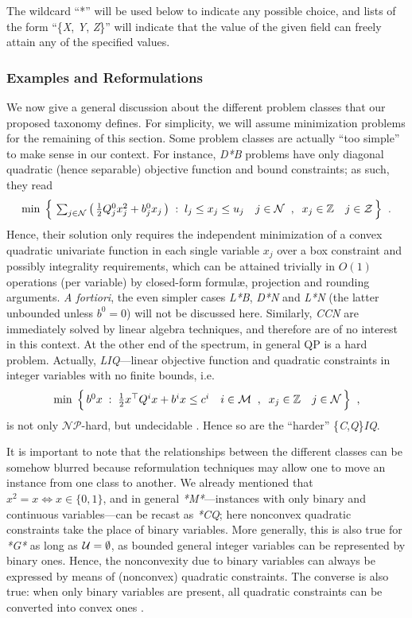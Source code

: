 The wildcard ``*'' will be used below to indicate any possible choice, and lists of the form ``\{\textit{X}, \textit{Y}, \textit{Z}\}'' will indicate that the value of the given field can freely attain any of the specified values.



\subsubsection{Examples and Reformulations}\label{ssec:reform}

We now give a general discussion about the different problem classes that our proposed taxonomy defines.
For simplicity, we will assume minimization problems for the remaining of this section.
Some problem classes are actually ``too simple'' to make sense in our context. For instance, \textit{D*B} problems have only diagonal quadratic (hence separable) objective function and bound constraints; as such, they read
\[
 \textstyle
 \min \; \Big\{ \,
 \sum_{j \in \mathcal{N}} \big( \, {\textstyle \frac{1}{2}} Q^0_j x_j^2 + b^0_j x_j \, \big) \;:\;
 l_j \leq x_j \leq u_j \quad j \in \mathcal{N} \;\;,\;\;
 x_j \in \mathbb{Z} \quad j \in \mathcal{Z} \, \Big\}
 \;\; .
\]
Hence, their solution only requires the independent minimization of a convex quadratic univariate function in each single variable $x_j$ over a box constraint and possibly integrality requirements, which can be attained trivially in $O(1)$ operations (per variable) by closed-form formul{\ae}, projection and rounding arguments. \emph{A fortiori}, the even simpler cases \textit{L*B}, \textit{D*N} and \textit{L*N} (the latter unbounded unless $b^0 = 0$) will not be discussed here. Similarly, \textit{CCN} are immediately solved by linear algebra techniques, and therefore are of no interest in this context. At the other end of the spectrum, in general QP is a hard problem. Actually, \textit{LIQ}---linear objective function and quadratic constraints in integer variables with no finite bounds, i.e.
\[
 \textstyle
 \min \; \Big\{ \, b^0 x \;:\;
 {\textstyle \frac{1}{2}} x^\top Q^i x + b^i x \leq c^i \quad i \in \mathcal{M} \;\;,\;\;
 x_j \in \mathbb{Z} \quad j \in \mathcal{N} \, \Big\}
 \;\; ,
\]
is not only $\mathcal{NP}$-hard, but undecidable \cite{jeroslow}. Hence so are the ``harder'' \{\textit{C},\textit{Q}\}\textit{IQ}.

It is important to note that the relationships between the different classes can be somehow blurred because reformulation techniques may allow one to move an instance from one class to another. We already mentioned that $x^2 = x \iff x \in \{0, 1\}$, and in general \textit{*M*}---instances with only binary and continuous variables---can be recast as \textit{*CQ}; here nonconvex quadratic constraints take the place of binary variables. More generally, this is also true for \textit{*G*} as long as $\mathcal{U} = \emptyset$, as bounded general integer variables can be represented by binary ones.
Hence, the nonconvexity due to binary variables can always be expressed by means of (nonconvex) quadratic constraints. The converse is also true: when only binary variables are present, all quadratic constraints can be converted into convex ones \cite{BEP09,BEL13}.


